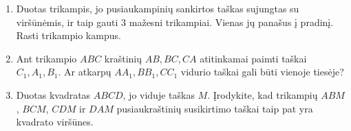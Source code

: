 \begin{enumerate}
  \item Duotas trikampis, jo pusiaukampinių sankirtos taškas sujungtas su
    viršūnėmis, ir taip gauti $3$ mažesni trikampiai. Vienas jų panašus į
    pradinį.  Rasti trikampio kampus.
  \item Ant trikampio $ABC$ kraštinių $AB, BC, CA$ atitinkamai paimti taškai
    $C_1, A_1, B_1$. Ar atkarpų $AA_1, BB_1, CC_1$ vidurio taškai gali būti
    vienoje tiesėje? 
  \item Duotas kvadratas $ABCD$, jo viduje taškas $M$.  Įrodykite, kad
    trikampių $ABM$, $BCM$, $CDM$ ir $DAM$ pusiaukraštinių susikirtimo taškai
    taip pat yra kvadrato viršūnes.

\end{enumerate}

